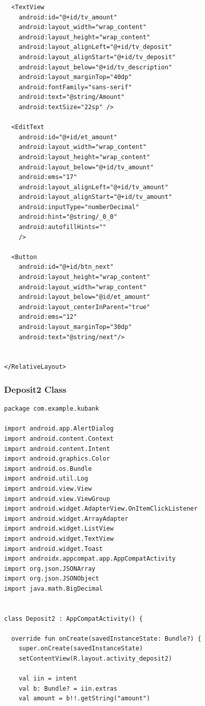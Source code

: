 \documentclass[11pt, a4paper]{article}
\begin{document}
\begin{appendices}
\begin{lstlisting}
  <TextView
    android:id="@+id/tv_amount"
    android:layout_width="wrap_content"
    android:layout_height="wrap_content"
    android:layout_alignLeft="@+id/tv_deposit"
    android:layout_alignStart="@+id/tv_deposit"
    android:layout_below="@+id/tv_description"
    android:layout_marginTop="40dp"
    android:fontFamily="sans-serif"
    android:text="@string/Amount"
    android:textSize="22sp" />

  <EditText
    android:id="@+id/et_amount"
    android:layout_width="wrap_content"
    android:layout_height="wrap_content"
    android:layout_below="@+id/tv_amount"
    android:ems="17"
    android:layout_alignLeft="@+id/tv_amount"
    android:layout_alignStart="@+id/tv_amount"
    android:inputType="numberDecimal"
    android:hint="@string/_0_0"
    android:autofillHints=""
    />

  <Button
    android:id="@+id/btn_next"
    android:layout_height="wrap_content"
    android:layout_width="wrap_content"
    android:layout_below="@id/et_amount"
    android:layout_centerInParent="true"
    android:ems="12"
    android:layout_marginTop="30dp"
    android:text="@string/next"/>


</RelativeLayout>
\end{lstlisting}
\subsubsection{Deposit2 Class}
\begin{lstlisting}
package com.example.kubank

import android.app.AlertDialog
import android.content.Context
import android.content.Intent
import android.graphics.Color
import android.os.Bundle
import android.util.Log
import android.view.View
import android.view.ViewGroup
import android.widget.AdapterView.OnItemClickListener
import android.widget.ArrayAdapter
import android.widget.ListView
import android.widget.TextView
import android.widget.Toast
import androidx.appcompat.app.AppCompatActivity
import org.json.JSONArray
import org.json.JSONObject
import java.math.BigDecimal


class Deposit2 : AppCompatActivity() {

  override fun onCreate(savedInstanceState: Bundle?) {
    super.onCreate(savedInstanceState)
    setContentView(R.layout.activity_deposit2)

    val iin = intent
    val b: Bundle? = iin.extras
    val amount = b!!.getString("amount")


\end{lstlisting}
\end{appendices}
\end{document}
